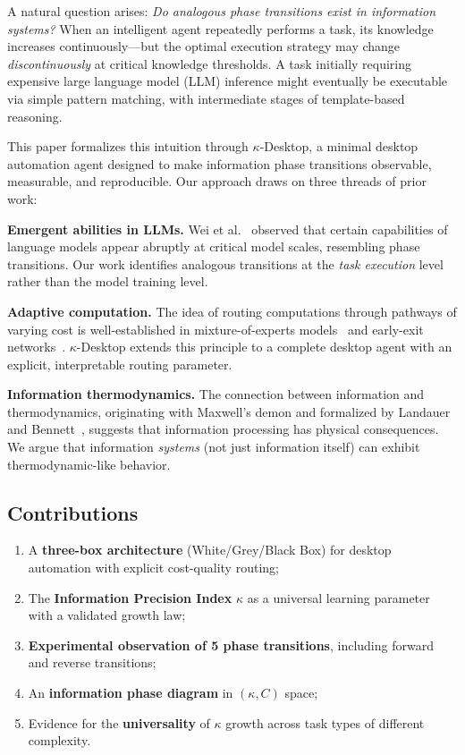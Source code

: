 \documentclass[10pt,twocolumn]{article}
\newcommand{\kap}{\kappa}
\newcommand{\kdes}{$\kappa$-Desktop}
\begin{document}
A natural question arises: \textit{Do analogous phase 
transitions exist in information systems?} When an intelligent 
agent repeatedly performs a task, its knowledge increases 
continuously---but the optimal execution strategy may change 
\textit{discontinuously} at critical knowledge thresholds. A 
task initially requiring expensive large language model (LLM) 
inference might eventually be executable via simple pattern 
matching, with intermediate stages of template-based reasoning.

This paper formalizes this intuition through \kdes{}, a 
minimal desktop automation agent designed to make information 
phase transitions observable, measurable, and reproducible. 
Our approach draws on three threads of prior work:

\textbf{Emergent abilities in LLMs.}
Wei et al.~\cite{wei2022} observed that certain capabilities 
of language models appear abruptly at critical model scales, 
resembling phase transitions. Our work identifies analogous 
transitions at the \textit{task execution} level rather than 
the model training level.

\textbf{Adaptive computation.}
The idea of routing computations through pathways of varying 
cost is well-established in mixture-of-experts 
models~\cite{shazeer2017} and early-exit 
networks~\cite{teerapittayanon2016}. \kdes{} extends this 
principle to a complete desktop agent with an explicit, 
interpretable routing parameter.

\textbf{Information thermodynamics.}
The connection between information and thermodynamics, 
originating with Maxwell's demon and formalized by 
Landauer~\cite{landauer1961} and 
Bennett~\cite{bennett1982}, suggests that information 
processing has physical consequences. We argue that 
information \textit{systems} (not just information itself) 
can exhibit thermodynamic-like behavior.

\subsection{Contributions}

\begin{enumerate}[leftmargin=*, itemsep=2pt]
  \item A \textbf{three-box architecture} (White/Grey/Black 
    Box) for desktop automation with explicit cost-quality 
    routing;
  \item The \textbf{Information Precision Index} $\kap$ as 
    a universal learning parameter with a validated growth 
    law;
  \item \textbf{Experimental observation of 5 phase 
    transitions}, including forward and reverse transitions;
  \item An \textbf{information phase diagram} in 
    $(\kap, C)$ space;
  \item Evidence for the \textbf{universality} of $\kap$ 
    growth across task types of different complexity.
\end{enumerate}
\end{document}
